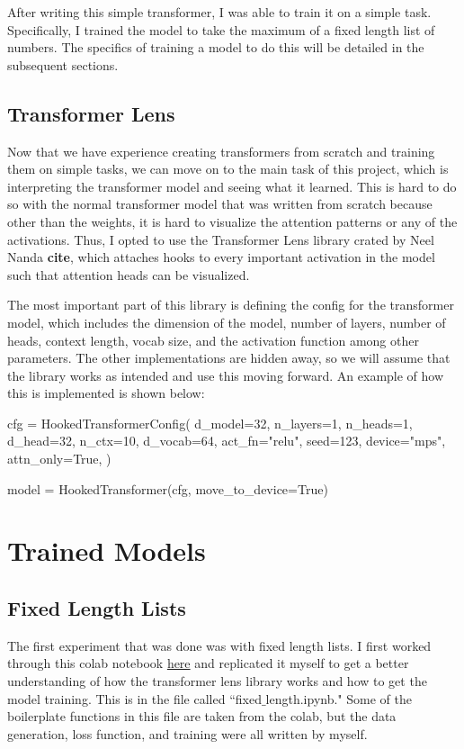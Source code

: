 \documentclass{article}
\begin{document}
After writing this simple transformer, I was able to train it on a simple task. Specifically, I trained the model to take the maximum of a fixed length list of numbers. The specifics of training a model to do this will be detailed in the subsequent sections.

\subsection{Transformer Lens}

Now that we have experience creating transformers from scratch and training them on simple tasks, we can move on to the main task of this project, which is interpreting the transformer model and seeing what it learned. This is hard to do so with the normal transformer model that was written from scratch because other than the weights, it is hard to visualize the attention patterns or any of the activations. Thus, I opted to use the Transformer Lens library crated by Neel Nanda \textbf{cite}, which attaches hooks to every important activation in the model such that attention heads can be visualized. 

The most important part of this library is defining the config for the transformer model, which includes the dimension of the model, number of layers, number of heads, context length, vocab size, and the activation function among other parameters. The other implementations are hidden away, so we will assume that the library works as intended and use this moving forward. An example of how this is implemented is shown below:

\begin{python}
cfg = HookedTransformerConfig(
    d_model=32,
    n_layers=1,
    n_heads=1,
    d_head=32,
    n_ctx=10,
    d_vocab=64,
    act_fn="relu",
    seed=123,
    device="mps",
    attn_only=True,
)

model = HookedTransformer(cfg, move_to_device=True)
\end{python}

\section{Trained Models}

\subsection{Fixed Length Lists}

The first experiment that was done was with fixed length lists. I first worked through this colab notebook \href{https://colab.research.google.com/drive/1N4iPEyBVuctveCA0Zre92SpfgH6nmHXY}{here} and replicated it myself to get a better understanding of how the transformer lens library works and how to get the model training. This is in the file called ``fixed$\_$length.ipynb." Some of the boilerplate functions in this file are taken from the colab, but the data generation, loss function, and training were all written by myself.
\end{document}
